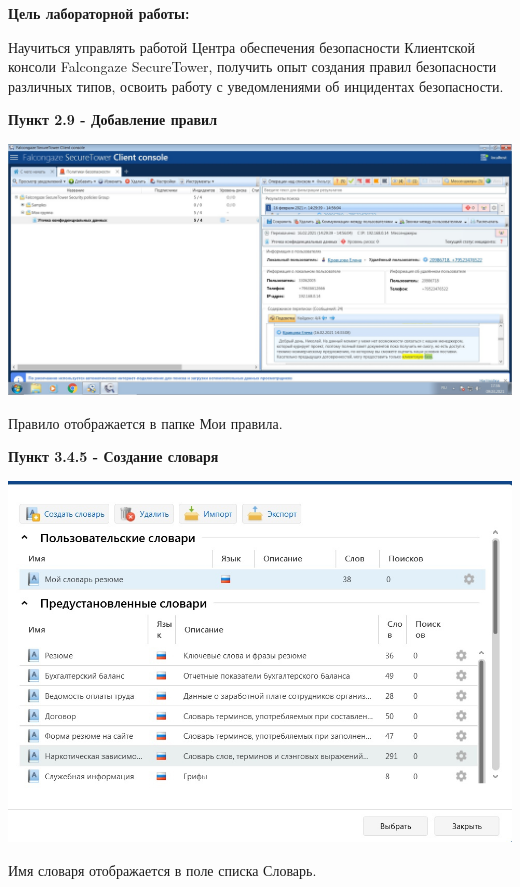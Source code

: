 \documentclass[a4paper,14pt]{extarticle}
\begin{document}
    \textbf{Цель лабораторной работы:}

    Научиться управлять работой Центра обеспечения безопасности Клиентской консоли Falcongaze
    SecureTower, получить опыт создания правил безопасности различных типов, освоить работу с 
    уведомлениями об инцидентах безопасности.

    \textbf{Пункт 2.9 - Добавление правил}
    \begin{center}
        \includegraphics[scale=0.25]{pics/2.9.jpg}

        Правило отображается в папке Мои правила.
    \end{center}

    \textbf{Пункт 3.4.5 - Создание словаря}
    \begin{center}
        \includegraphics[scale=0.4]{pics/3.4.5.jpg}
        
        Имя словаря отображается в поле списка Словарь.
    \end{center}
\end{document}
